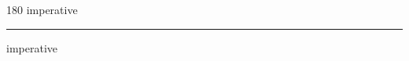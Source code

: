 
\begin{frame}
\begin{center}
\begin{turn}{180}
{\fontsize{2.5cm}{1em}\selectfont imperative}
\end{turn}
\vspace{1em}\par  
\hrule
\vspace{1em}\par  
{\fontsize{2.5cm}{1em}\selectfont imperative}
\end{center}
\end{frame}
